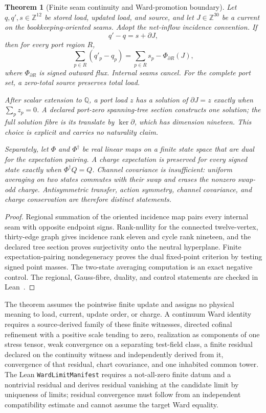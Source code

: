 \documentclass[11pt]{article}
\newtheorem{theorem}{Theorem}[section]
\theoremstyle{remark}
\theoremstyle{plain}
\begin{document}
\begin{theorem}[Finite seam continuity and Ward-promotion boundary]
\label{thm:finite-seam-continuity-ward-boundary}
Let \(q,q',s\in\mathbb Z^{12}\) be stored load, updated load, and source,
and let \(J\in\mathbb Z^{30}\) be a current on the bookkeeping-oriented
seams. Adopt the net-inflow incidence convention. If
\[
q'-q=s+\partial J,
\]
then for every port region \(R\),
\[
\sum_{p\in R}(q'_p-q_p)
=\sum_{p\in R}s_p-\Phi_{\partial R}(J),
\]
where \(\Phi_{\partial R}\) is signed outward flux. Internal seams cancel.
For the complete port set, a zero-total source preserves total load.

After scalar extension to \(\mathbb Q\), a port load \(z\) has a solution of
\(\partial J=z\) exactly when \(\sum_p z_p=0\). A declared port-zero
spanning-tree section constructs one solution; the full solution fibre is its
translate by \(\ker\partial\), which has dimension nineteen. This choice is
explicit and carries no naturality claim.

Separately, let \(\Phi\) and \(\Phi^\dagger\) be real linear maps on a finite
state space that are dual for the expectation pairing. A charge expectation
is preserved for every signed state exactly when
\(\Phi^\dagger Q=Q\). Channel covariance is insufficient: uniform averaging
on two states commutes with their swap and erases the nonzero swap-odd
charge. Antisymmetric transfer, action symmetry, channel covariance, and
charge conservation are therefore distinct statements.
\end{theorem}

\begin{proof}
Regional summation of the oriented incidence map pairs every internal seam
with opposite endpoint signs. Rank-nullity for the connected twelve-vertex,
thirty-edge graph gives incidence rank eleven and cycle rank nineteen, and
the declared tree section proves surjectivity onto the neutral hyperplane.
Finite expectation-pairing nondegeneracy proves the dual fixed-point
criterion by testing signed point masses. The two-state averaging computation
is an exact negative control. The regional, Gauss-fibre, duality, and control
statements are checked in Lean~\cite{ophrepo}.
\end{proof}

The theorem assumes the pointwise finite update and assigns no physical
meaning to load, current, update order, or charge. A continuum Ward identity
requires a source-derived family of these finite witnesses, directed cofinal
refinement with a positive scale tending to zero, realization as components
of one stress tensor, weak convergence on a separating test-field class, a
finite residual declared on the continuity witness and independently derived
from it, convergence of that residual, chart covariance, and one inhabited
common tower. The Lean \texttt{WardLimitManifest} requires a not-all-zero
finite datum and a nontrivial residual and derives residual vanishing at the
candidate limit by uniqueness of limits; residual convergence must follow
from an independent compatibility estimate and cannot assume the target Ward
equality.
\end{document}
